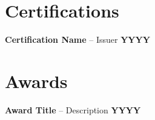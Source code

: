 \documentclass[a4paper,10pt]{article}
\begin{document}
\vspace{0.3cm}

\section*{Certifications}
\textbf{Certification Name} – Issuer \hfill \textbf{YYYY}

\vspace{0.3cm}

\section*{Awards}
\textbf{Award Title} – Description \hfill \textbf{YYYY}
\end{document}
